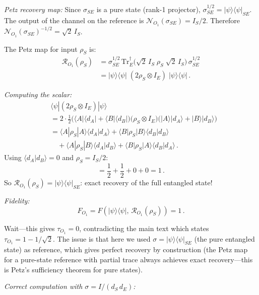 \documentclass[aps,prd,preprint,superscriptaddress,longbibliography]{revtex4-2}
\newcommand{\Tr}{\mathrm{Tr}}
\newcommand{\Petz}{\mathcal{R}}
\newcommand{\chan}{\mathcal{N}}
\newcommand{\ket}[1]{|#1\rangle}
\newcommand{\bra}[1]{\langle#1|}
\newcommand{\braket}[2]{\langle#1|#2\rangle}
\newcommand{\tauasym}{\tau}
\begin{document}
\emph{Petz recovery map:}
Since $\sigma_{SE}$ is a pure state (rank-1 projector),
$\sigma_{SE}^{1/2} = \ket{\psi}\!\bra{\psi}_{SE}$.
The output of the channel on the reference is
$\chan_{O_1}(\sigma_{SE}) = I_S/2$.  Therefore
$\chan_{O_1}(\sigma_{SE})^{-1/2} = \sqrt{2}\,I_S$.

The Petz map for input $\rho_S$ is:
\begin{align}
  \Petz_{O_1}(\rho_S) &= \sigma_{SE}^{1/2}\,
  \Tr_E^\dagger\!\big(\sqrt{2}\,I_S\;\rho_S\;\sqrt{2}\,I_S\big)\,
  \sigma_{SE}^{1/2}
  \nonumber\\
  &= \ket{\psi}\!\bra{\psi}\;(2\rho_S \otimes I_E)\;\ket{\psi}\!\bra{\psi}\,.
  \label{eq:Petz_O1}
\end{align}

\emph{Computing the scalar:}
\begin{align}
  &\bra{\psi}(2\rho_S \otimes I_E)\ket{\psi}
  \nonumber\\
  &= 2\cdot\frac{1}{2}\big(\bra{A}\!\bra{d_A} + \bra{B}\!\bra{d_B}\big)
  \big(\rho_S\otimes I_E\big)
  \big(\ket{A}\!\ket{d_A} + \ket{B}\!\ket{d_B}\big)
  \nonumber\\
  &= \bra{A}\rho_S\ket{A}\braket{d_A}{d_A}
  + \bra{B}\rho_S\ket{B}\braket{d_B}{d_B}
  \nonumber\\
  &\quad+ \bra{A}\rho_S\ket{B}\braket{d_A}{d_B}
  + \bra{B}\rho_S\ket{A}\braket{d_B}{d_A}\,.
  \label{eq:scalar_calc}
\end{align}
Using $\braket{d_A}{d_B} = 0$ and $\rho_S = I_S/2$:
\begin{equation}
  = \frac{1}{2} + \frac{1}{2} + 0 + 0 = 1\,.
  \label{eq:scalar_result}
\end{equation}
So $\Petz_{O_1}(\rho_S) = \ket{\psi}\!\bra{\psi}_{SE}$: exact
recovery of the full entangled state!

\emph{Fidelity:}
\begin{equation}
  F_{O_1} = F(\ket{\psi}\!\bra{\psi},\,\Petz_{O_1}(\rho_S)) = 1\,.
  \label{eq:F_O1}
\end{equation}

Wait---this gives $\tauasym_{O_1} = 0$, contradicting the main text
which states $\tauasym_{O_1} = 1 - 1/\sqrt{2}$.  The issue is that
here we used $\sigma = \ket{\psi}\!\bra{\psi}_{SE}$ (the pure entangled
state) as reference, which gives perfect recovery by construction
(the Petz map for a pure-state reference with partial trace always
achieves exact recovery---this is Petz's sufficiency theorem for
pure states).

\emph{Correct computation with $\sigma = I/(d_S\,d_E)$:}
\end{document}
